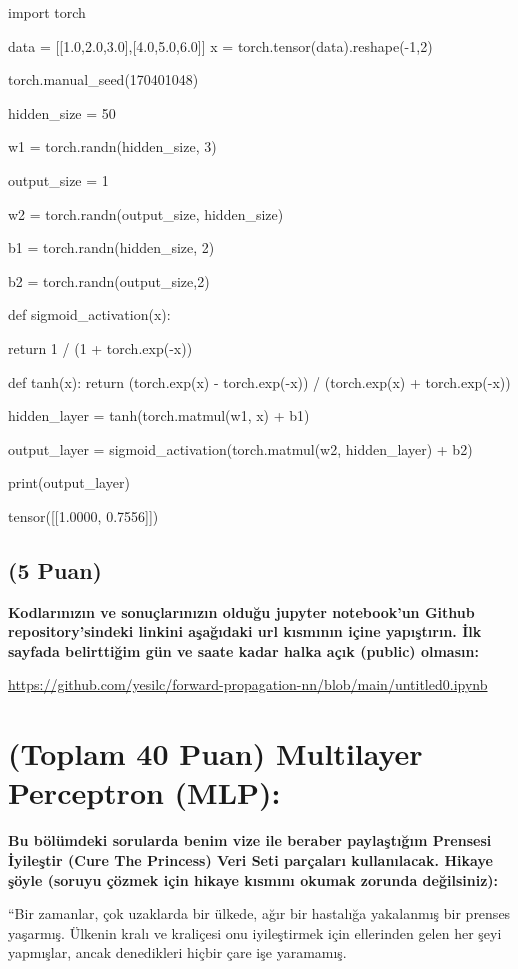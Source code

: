 \documentclass[11pt]{article}
\begin{document}
\begin{python}
import torch

data = [[1.0,2.0,3.0],[4.0,5.0,6.0]]
x = torch.tensor(data).reshape(-1,2)

torch.manual_seed(170401048)

hidden_size = 50

w1 = torch.randn(hidden_size, 3)

output_size = 1

w2 = torch.randn(output_size, hidden_size)

b1 = torch.randn(hidden_size, 2)

b2 = torch.randn(output_size,2)

def sigmoid_activation(x):

  return 1 / (1 + torch.exp(-x))

def tanh(x):
  return (torch.exp(x) - torch.exp(-x)) / (torch.exp(x) + torch.exp(-x))

hidden_layer = tanh(torch.matmul(w1, x) + b1)

output_layer = sigmoid_activation(torch.matmul(w2, hidden_layer) + b2)

print(output_layer)
\end{python}

tensor([[1.0000, 0.7556]])

\subsection{(5 Puan)} \textbf{Kodlarınızın ve sonuçlarınızın olduğu jupyter notebook'un Github repository'sindeki linkini aşağıdaki url kısmının içine yapıştırın. İlk sayfada belirttiğim gün ve saate kadar halka açık (public) olmasın:}

\url{https://github.com/yesilc/forward-propagation-nn/blob/main/untitled0.ipynb}

\section{(Toplam 40 Puan) Multilayer Perceptron (MLP):} 
\textbf{Bu bölümdeki sorularda benim vize ile beraber paylaştığım Prensesi İyileştir (Cure The Princess) Veri Seti parçaları kullanılacak. Hikaye şöyle (soruyu çözmek için hikaye kısmını okumak zorunda değilsiniz):} 

``Bir zamanlar, çok uzaklarda bir ülkede, ağır bir hastalığa yakalanmış bir prenses yaşarmış. Ülkenin kralı ve kraliçesi onu iyileştirmek için ellerinden gelen her şeyi yapmışlar, ancak denedikleri hiçbir çare işe yaramamış.
\end{document}
